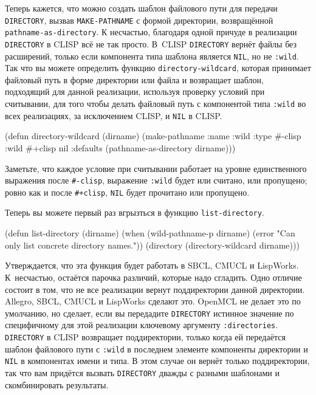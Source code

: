 Теперь кажется, что можно создать шаблон файлового пути для передачи \lstinline{DIRECTORY},
вызвав \lstinline{MAKE-PATHNAME} с формой директории, возвращённой
\lstinline{pathname-as-directory}. К несчастью, благодаря одной причуде в реализации
\lstinline{DIRECTORY} в CLISP всё не так просто. В~CLISP \lstinline{DIRECTORY} вернёт файлы без
расширений, только если компонента типа шаблона является \lstinline{NIL}, но не
\lstinline{:wild}. Так что вы можете определить функцию \lstinline{directory-wildcard}, которая
принимает файловый путь в форме директории или файла и возвращает шаблон, подходящий для
данной реализации, используя проверку условий при считывании, для того чтобы делать
файловый путь с компонентой типа \lstinline{:wild} во всех реализациях, за исключением CLISP, и
\lstinline{NIL} в CLISP.

\begin{myverb}
(defun directory-wildcard (dirname)
  (make-pathname
   :name :wild
   :type #-clisp :wild #+clisp nil
   :defaults (pathname-as-directory dirname)))
\end{myverb}

Заметьте, что каждое условие при считывании работает на уровне единственного выражения
после \lstinline!#-clisp!, выражение \lstinline{:wild} будет или считано, или пропущено; ровно
как и после \lstinline!#+clisp!, \lstinline{NIL} будет прочитано или пропущено.

Теперь вы можете первый раз вгрызться в функцию \lstinline{list-directory}.

\begin{myverb}
(defun list-directory (dirname)
  (when (wild-pathname-p dirname)
    (error "Can only list concrete directory names."))
  (directory (directory-wildcard dirname)))
\end{myverb}

Утверждается, что эта функция будет работать в SBCL, CMUCL и LispWorks. К~несчастью,
остаётся парочка различий, которые надо сгладить. Одно отличие состоит в том, что не все
реализации вернут поддиректории данной директории. Allegro, SBCL, CMUCL и LispWorks
сделают это. OpenMCL не делает это по умолчанию, но сделает, если вы передадите
\lstinline{DIRECTORY} истинное значение по специфичному для этой реализации ключевому аргументу
\lstinline{:directories}. \lstinline{DIRECTORY} в CLISP возвращает поддиректории, только когда ей
передаётся шаблон файлового пути с \lstinline{:wild} в последнем элементе компоненты директории
и \lstinline{NIL} в компонентах имени и типа. В этом случае он вернёт только поддиректории,
так что вам придётся вызвать \lstinline{DIRECTORY} дважды с разными шаблонами и скомбинировать
результаты.

